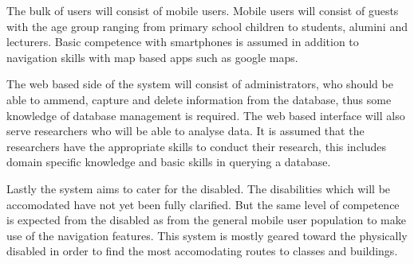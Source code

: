 The bulk of users will consist of mobile users. Mobile users will consist of guests with the age group ranging from primary school children to students, alumini and lecturers. Basic competence with smartphones is assumed in addition to navigation skills with map based apps such as google maps.

The web based side of the system will consist of administrators, who should be able to ammend, capture and delete information from the database, thus some knowledge of database management is required. The web based interface will also serve researchers who will be able to analyse data. It is assumed that the researchers have the appropriate skills to conduct their research, this includes domain specific knowledge and basic skills in querying a database.

Lastly the system aims to cater for the disabled. The disabilities which will be accomodated have not yet been fully clarified. But the same level of competence is expected from the disabled as from the general mobile user population to make use of the navigation features. This system is mostly geared toward the physically disabled in order to find the most accomodating routes to classes and buildings.
